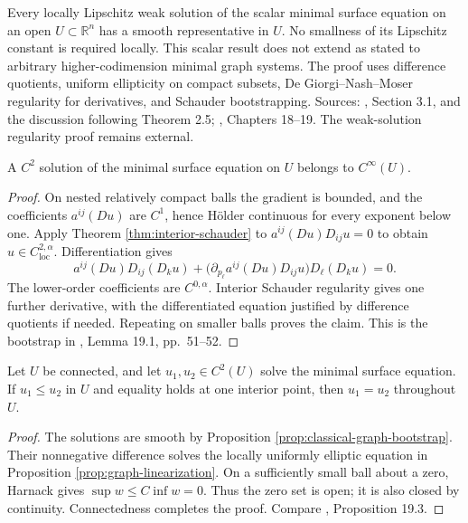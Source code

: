 \begin{theorem}\label{thm:lipschitz-minimal-regularity}
Every locally Lipschitz weak solution of the scalar minimal surface equation on an open $U\subset\mathbb R^n$ has a smooth representative in $U$. No smallness of its Lipschitz constant is required locally. This scalar result does not extend as stated to arbitrary higher-codimension minimal graph systems. The proof uses difference quotients, uniform ellipticity on compact subsets, De Giorgi--Nash--Moser regularity for derivatives, and Schauder bootstrapping. Sources: \cite{Minter}, Section 3.1, and the discussion following Theorem 2.5; \cite{SimonPDE}, Chapters 18--19. The weak-solution regularity proof remains external.
\end{theorem}

\begin{proposition}\label{prop:classical-graph-bootstrap}
A $C^2$ solution of the minimal surface equation on $U$ belongs to $C^\infty(U)$.
\end{proposition}
\begin{proof}
On nested relatively compact balls the gradient is bounded, and the coefficients $a^{ij}(Du)$ are $C^1$, hence Hölder continuous for every exponent below one. Apply Theorem \ref{thm:interior-schauder} to $a^{ij}(Du)D_{ij}u=0$ to obtain $u\in C^{2,\alpha}_{\mathrm{loc}}$. Differentiation gives
\[
 a^{ij}(Du)D_{ij}(D_k u)+
 \bigl(\partial_{p_\ell}a^{ij}(Du)D_{ij}u\bigr)D_\ell(D_k u)=0.
\]
The lower-order coefficients are $C^{0,\alpha}$. Interior Schauder regularity gives one further derivative, with the differentiated equation justified by difference quotients if needed. Repeating on smaller balls proves the claim. This is the bootstrap in \cite{ChMin}, Lemma 19.1, pp.~51--52.
\end{proof}

\begin{proposition}\label{prop:graph-strong-comparison}
Let $U$ be connected, and let $u_1,u_2\in C^2(U)$ solve the minimal surface equation. If $u_1\leq u_2$ in $U$ and equality holds at one interior point, then $u_1=u_2$ throughout $U$.
\end{proposition}
\begin{proof}
The solutions are smooth by Proposition \ref{prop:classical-graph-bootstrap}. Their nonnegative difference solves the locally uniformly elliptic equation in Proposition \ref{prop:graph-linearization}. On a sufficiently small ball about a zero, Harnack gives $\sup w\leq C\inf w=0$. Thus the zero set is open; it is also closed by continuity. Connectedness completes the proof. Compare \cite{ChMin}, Proposition 19.3.
\end{proof}

